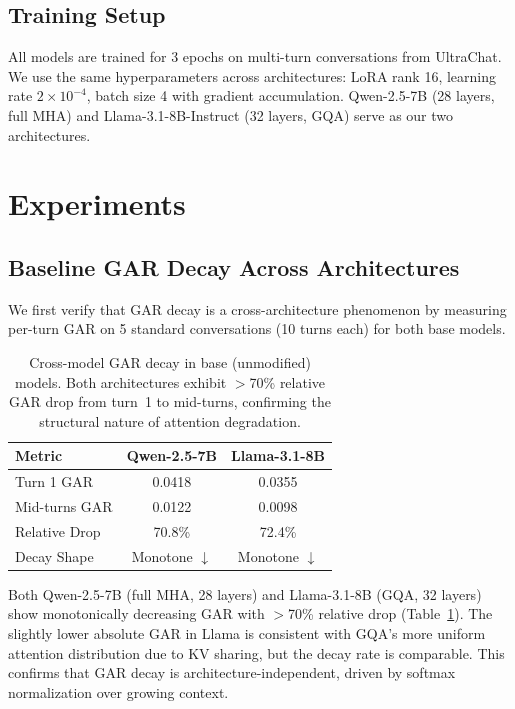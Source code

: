 \documentclass[11pt,a4paper]{article}
\begin{document}
\subsection{Training Setup}

All models are trained for 3 epochs on multi-turn conversations from UltraChat.
We use the same hyperparameters across architectures: LoRA rank 16, learning rate $2 \times 10^{-4}$, batch size 4 with gradient accumulation.
Qwen-2.5-7B (28 layers, full MHA) and Llama-3.1-8B-Instruct (32 layers, GQA) serve as our two architectures.

\section{Experiments}

\subsection{Baseline GAR Decay Across Architectures}

We first verify that GAR decay is a cross-architecture phenomenon by measuring per-turn GAR on 5 standard conversations (10 turns each) for both base models.

\begin{table}[h]
\centering
\caption{Cross-model GAR decay in base (unmodified) models. Both architectures exhibit $>$70\% relative GAR drop from turn~1 to mid-turns, confirming the structural nature of attention degradation.}
\label{tab:gar-decay}
\begin{tabular}{lcc}
\toprule
\textbf{Metric} & \textbf{Qwen-2.5-7B} & \textbf{Llama-3.1-8B} \\
\midrule
Turn 1 GAR       & 0.0418 & 0.0355 \\
Mid-turns GAR    & 0.0122 & 0.0098 \\
Relative Drop    & 70.8\% & 72.4\% \\
Decay Shape      & Monotone $\downarrow$ & Monotone $\downarrow$ \\
\bottomrule
\end{tabular}
\end{table}

Both Qwen-2.5-7B (full MHA, 28 layers) and Llama-3.1-8B (GQA, 32 layers) show monotonically decreasing GAR with $>$70\% relative drop (Table~\ref{tab:gar-decay}).
The slightly lower absolute GAR in Llama is consistent with GQA's more uniform attention distribution due to KV sharing, but the decay rate is comparable.
This confirms that GAR decay is architecture-independent, driven by softmax normalization over growing context.
\end{document}
